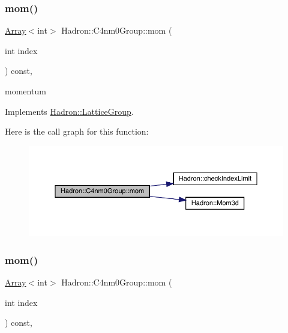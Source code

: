 \subsubsection{\texorpdfstring{mom()}{mom()}\hspace{0.1cm}{\footnotesize\ttfamily [1/3]}}
{\footnotesize\ttfamily \mbox{\hyperlink{classXMLArray_1_1Array}{Array}}$<$int$>$ Hadron\+::\+C4nm0\+Group\+::mom (\begin{DoxyParamCaption}\item[{int}]{index }\end{DoxyParamCaption}) const\hspace{0.3cm}{\ttfamily [inline]}, {\ttfamily [virtual]}}

momentum 

Implements \mbox{\hyperlink{structHadron_1_1LatticeGroup_ad577b65041dd9a6e84b1f3bd49cb8fce}{Hadron\+::\+Lattice\+Group}}.

Here is the call graph for this function\+:
\nopagebreak
\begin{figure}[H]
\begin{center}
\leavevmode
\includegraphics[width=350pt]{da/da1/structHadron_1_1C4nm0Group_a45599b94fa4633619247f4827e03ca23_cgraph}
\end{center}
\end{figure}
\mbox{\label{structHadron_1_1C4nm0Group_a45599b94fa4633619247f4827e03ca23}} 
\subsubsection{\texorpdfstring{mom()}{mom()}\hspace{0.1cm}{\footnotesize\ttfamily [2/3]}}
{\footnotesize\ttfamily \mbox{\hyperlink{classXMLArray_1_1Array}{Array}}$<$int$>$ Hadron\+::\+C4nm0\+Group\+::mom (\begin{DoxyParamCaption}\item[{int}]{index }\end{DoxyParamCaption}) const\hspace{0.3cm}{\ttfamily [inline]}, {\ttfamily [virtual]}}


